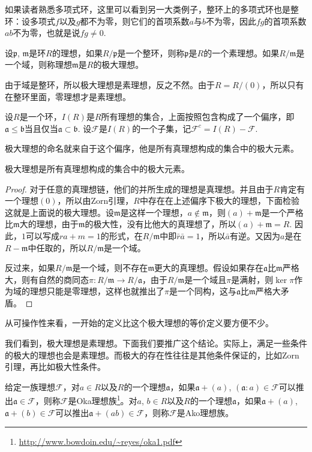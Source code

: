 如果读者熟悉多项式环，这里可以看到另一大类例子，整环上的多项式环也是整环：设多项式$f$以及$g$都不为零，则它们的首项系数$a$与$b$不为零，因此$fg$的首项系数$ab$不为零，也就是说$fg\neq 0$.

\para[素理想与极大理想] 设$\mathfrak{p}$, $\mathfrak{m}$是环$R$的理想，如果$R/\mathfrak{p}$是一个整环，则称$\mathfrak{p}$是$R$的一个素理想。如果$R/\mathfrak{m}$是一个域，则称理想$\mathfrak{m}$是$R$的极大理想。\endpara

由于域是整环，所以极大理想是素理想，反之不然。由于$R=R/(0)$，所以只有在整环里面，零理想才是素理想。

\para[理想集的偏序] 设$R$是一个环，$I(R)$是$R$所有理想的集合，上面按照包含构成了一个偏序，即$\mathfrak{a}\leq \mathfrak{b}$当且仅当$\mathfrak{a}\subset \mathfrak{b}$. 设$\mathcal{F}$是$I(R)$的一个子集，记$\mathcal{F}^c=I(R)-\mathcal{F}$.\endpara

极大理想的命名就来自于这个偏序，他是所有真理想构成的集合中的极大元素。

\begin{pro}
	极大理想是所有真理想构成的集合中的极大元素。
\end{pro}

\begin{proof}
	对于任意的真理想链，他们的并所生成的理想是真理想。并且由于$R$肯定有一个理想$(0)$，所以由Zorn引理，$R$中存在在上述偏序下极大的理想，下面检验这就是上面说的极大理想。设$\mathfrak{m}$是这样一个理想，$a\notin \mathfrak{m}$，则$(a)+\mathfrak{m}$是一个严格比$\mathfrak{m}$大的理想，由于$\mathfrak{m}$的极大性，没有比他大的真理想了，所以$(a)+\mathfrak{m}=R$. 因此，$1$可以写成$ra+m=1$的形式，在$R/\mathfrak{m}$中即$\bar{r}\bar{a}=1$，所以$\bar{a}$有逆。又因为$a$是在$R-\mathfrak{m}$中任取的，所以$R/\mathfrak{m}$是一个域。

	反过来，如果$R/\mathfrak{m}$是一个域，则不存在$\mathfrak{m}$更大的真理想。假设如果存在$\mathfrak{a}$比$\mathfrak{m}$严格大，则有自然的商同态$\pi:R/\mathfrak{m}\to R/\mathfrak{a}$，由于$R/\mathfrak{m}$是一个域且$\pi$是满射，则$\ker \pi$作为域的理想只能是零理想，这样也就推出了$\pi$是一个同构，这与$\mathfrak{a}$比$\mathfrak{m}$严格大矛盾。
\end{proof}

从可操作性来看，一开始的定义比这个极大理想的等价定义要方便不少。

\para \label{oka}我们看到，极大理想是素理想。下面我们要推广这个结论。实际上，满足一些条件的极大的理想也会是素理想。而极大的存在性往往是其他条件保证的，比如Zorn引理，再比如极大性条件。

给定一族理想$\mathcal{F}$，对$a\in R$以及$R$的一个理想$\mathfrak{a}$，如果$\mathfrak{a}+(a)$, $(\mathfrak{a}:a)\in \mathcal{F}$可以推出$\mathfrak{a}\in \mathcal{F}$，则称$\mathcal{F}$是Oka理想族\footnote{\url{http://www.bowdoin.edu/~reyes/oka1.pdf}}。对$a$, $b\in R$以及$R$的一个理想$\mathfrak{a}$，如果$\mathfrak{a}+(a)$, $\mathfrak{a}+(b)\in \mathcal{F}$可以推出$\mathfrak{a}+(ab)\in \mathcal{F}$，则称$\mathcal{F}$是Ako理想族。

